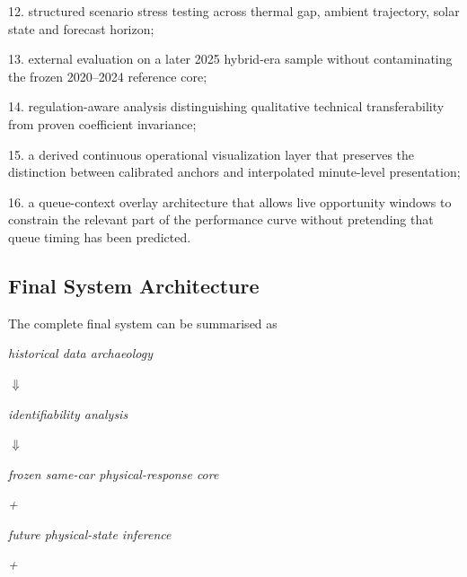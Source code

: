 12. structured scenario stress testing across thermal gap, ambient trajectory, solar state and forecast horizon;

13. external evaluation on a later 2025 hybrid-era sample without contaminating the frozen 2020--2024 reference core;

14. regulation-aware analysis distinguishing qualitative technical transferability from proven coefficient invariance;

15. a derived continuous operational visualization layer that preserves the distinction between calibrated anchors and interpolated minute-level presentation;

16. a queue-context overlay architecture that allows live opportunity windows to constrain the relevant part of the performance curve without pretending that queue timing has been predicted.

\subsection{Final System Architecture}
The complete final system can be summarised as

\begin{center}\textit{historical data archaeology}\end{center}

\begin{center}\textit{\ensuremath{\Downarrow}}\end{center}

\begin{center}\textit{identifiability analysis}\end{center}

\begin{center}\textit{\ensuremath{\Downarrow}}\end{center}

\begin{center}\textit{frozen same-car physical-response core}\end{center}

\begin{center}\textit{+}\end{center}

\begin{center}\textit{future physical-state inference}\end{center}

\begin{center}\textit{+}\end{center}

